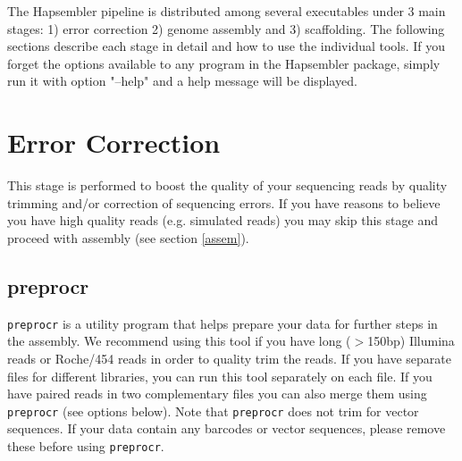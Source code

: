 \documentclass[12pt,a4paper]{report}
\begin{document}
The Hapsembler pipeline is distributed among several executables under 3 main stages: 1) error correction 2) genome assembly and 3) scaffolding. The following sections describe each stage in detail and how to use the individual tools. If you forget the options available to any program in the Hapsembler package, simply run it with option "--help" and a help message will be displayed.

\section{Error Correction}
\label{ercor}

This stage is performed to boost the quality of your sequencing reads by quality trimming and/or correction of sequencing errors. If you have reasons to believe you have high quality reads (e.g. simulated reads) you may skip this stage and proceed with assembly (see section \ref{assem}).

\subsection{preprocr}
\label{utils}

\texttt{preprocr} is a utility program that helps prepare your data for further steps in the assembly. We recommend using this tool if you have long ($>$150bp) Illumina reads or Roche/454 reads in order to quality trim the reads. If you have separate files for different libraries, you can run this tool separately on each file. If you have paired reads in two complementary files you can also merge them using \texttt{preprocr} (see options below). Note that \texttt{preprocr} does not trim for vector sequences. If your data contain any barcodes or vector sequences, please remove these before using \texttt{preprocr}.
\end{document}
